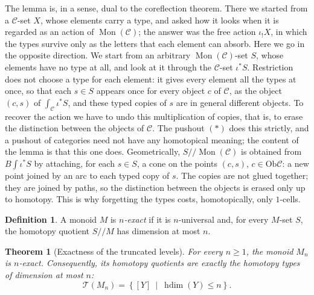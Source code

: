 \documentclass[11pt]{amsart}
\newtheorem{theorem}[teo]{Theorem}
\theoremstyle{definition}
\newtheorem{definition}[teo]{Definition}
\theoremstyle{remark}
\numberwithin{figure}{section}%
\DeclareMathOperator{\Mon}{Mon}
\newcommand{\C}{\mathcal{C}}
\newcommand{\T}{\mathcal{T}}
\newcommand{\Ob}{\mathrm{Ob}}
\begin{document}
The lemma is, in a sense, dual to the coreflection theorem. There we started from a $\C$-set $X$, whose elements carry a type, and asked how it looks when it is regarded as an action of $\Mon(\C)$; the answer was the free action $\iota_!X$, in which the types survive only as the letters that each element can absorb. Here we go in the opposite direction. We start from an arbitrary $\Mon(\C)$-set $S$, whose elements have no type at all, and look at it through the $\C$-set $\iota^*S$. Restriction does not choose a type for each element: it gives every element all the types at once, so that each $s\in S$ appears once for every object $c$ of $\C$, as the object $(c,s)$ of $\int_\C\iota^*S$, and these typed copies of $s$ are in general different objects. To recover the action we have to undo this multiplication of copies, that is, to erase the distinction between the objects of $\C$. The pushout $(*)$ does this strictly, and a pushout of categories need not have any homotopical meaning; the content of the lemma is that this one does. Geometrically, $S/\!/\Mon(\C)$ is obtained from $B\!\int\iota^*S$ by attaching, for each $s\in S$, a cone on the points $(c,s)$, $c\in\Ob\C$: a new point joined by an arc to each typed copy of $s$. The copies are not glued together; they are joined by paths, so the distinction between the objects is erased only up to homotopy. This is why forgetting the types costs, homotopically, only $1$-cells.

\begin{definition}
A monoid $M$ is \emph{$n$-exact} if it is $n$-universal and, for every $M$-set $S$, the homotopy quotient $S/\!/M$ has dimension at most $n$.
\end{definition}

\begin{theorem}[Exactness of the truncated levels]
\label{thm:Mn-n-exact}
For every $n\geq1$, the monoid $M_n$ is $n$-exact. Consequently, its homotopy quotients are exactly the homotopy types of dimension at most $n$:
\[
\T(M_n)=\left\{[Y]\ \middle|\ \operatorname{hdim}(Y)\leq n\right\}.
\]
\end{theorem}
\end{document}
